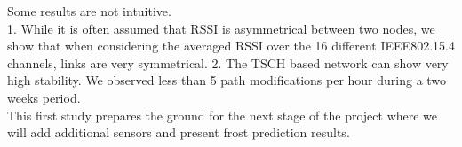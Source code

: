 \documentclass{sig-alternate}
\begin{document}
Some results are not intuitive.\\
1. While it is often assumed that RSSI is asymmetrical between two nodes, we show that when considering the averaged RSSI over the 16 different IEEE802.15.4 channels, links are very symmetrical.
2. The TSCH based network can show very high stability.
We observed less than 5 path modifications per hour during a two weeks period.\\

This first study prepares the ground for the next stage of the project where we will add additional sensors and present frost prediction results.





\end{document}
